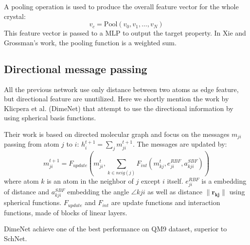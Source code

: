 \documentclass{article}
\begin{document}
A pooling operation is used to produce the overall feature vector for the whole crystal:
\begin{equation}
    v_c = \text{Pool}(v_0, v_1, \dots, v_N)
\end{equation}
This feature vector is passed to a MLP to output the target property. In Xie and Grossman's work,
the pooling function is a weighted sum. 

\subsection{Directional message passing}
All the previous network use only distance between two atoms as edge feature, 
but directional feature are unutilized. 
Here we shortly mention the work by Klicpera et al.\cite{directional_klicpera} (DimeNet) 
that attempt to use the directional information by using spherical basis functions. 

Their work is based on directed molecular graph and focus on the messages $m_{ji}$ passing from 
atom $j$ to $i$: $h_i^{t+1} = \sum_j m^{t+1}_{ji}$. The messages are updated by:
\begin{equation}
    m_{ji}^{t+1} 
    = F_{update}\left( m_{ji}^t, \sum_{k \in neig(j)} F_{int}(m_{kj}^{t}, e_{ji}^{RBF}, a^{SBF}_{kji}) \right)
\end{equation}
where atom $k$ is an atom in the neighbor of $j$ except $i$ itself. $e_{ji}^{RBF}$ is a 
embedding of distance and $a^{SBF}_{kji}$ embedding the angle $\angle kji$ as well as distance 
$\|\mathbf{r_{kj}}\|$ using spherical functions. 
$F_{update}$ and $F_{int}$ are update functions and interaction functions, made of blocks 
of linear layers.

DimeNet achieve one of the best performance on QM9 dataset, superior to SchNet.
\end{document}
